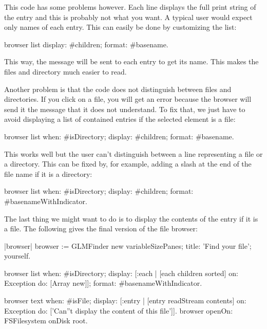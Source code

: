 \documentclass[a4paper,10pt,twoside]{book}
\begin{document}
This code has some problems however. Each line displays the full print
string of the entry and this is probably not what you want. A typical
user would expect only names of each entry. This can easily be done by
customizing the list:

\begin{code}{}
browser list
  display: #children;
  format: #basename.
\end{code}

This way, the message  will be sent to each entry to get its
name. This makes the files and directory much easier to read.

Another problem is that the code does not distinguish between files
and directories. If you click on a file, you will get an error because
the browser will send it the message  that it does not
understand. To fix that, we just have to avoid displaying a list of
contained entries if the selected element is a file:

\begin{code}{}
browser list
  when: #isDirectory;
  display: #children;
  format: #basename.
\end{code}

This works well but the user can't distinguish between a line
representing a file or a directory. This can be fixed by, for example,
adding a slash at the end of the file name if it is a directory:

\begin{code}{}
browser list
  when: #isDirectory;
  display: #children;
  format: #basenameWithIndicator.
\end{code}

The last thing we might want to do is to display the contents of the
entry if it is a file. The following gives the final version of the
file browser:

\begin{code}{}
|browser|
browser := GLMFinder new
  variableSizePanes;
  title: 'Find your file';
  yourself.

browser list
  when: #isDirectory;
  display: [:each | [each children sorted]
                       on: Exception
                       do: [Array new]];
  format: #basenameWithIndicator.

browser text
  when: #isFile;
  display: [:entry | [entry readStream contents]
                        on: Exception
                        do: ['Can''t display the content of this file']].
browser openOn: FSFilesystem onDisk root.
\end{code}
\end{document}
